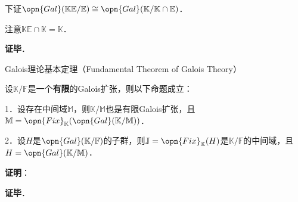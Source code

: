 下证$\opn{Gal}(\mathbb{KE}/\mathbb{E})\cong\opn{Gal}(\mathbb{K}/\mathbb{K}\cap\mathbb{E})$．

注意$\mathbb{KE}\cap \mathbb{K}=\mathbb{K}$．

\textbf{证毕}．











\begin{theorem}{Galois理论基本定理（Fundamental Theorem of Galois Theory）}

设$\mathbb{K}/\mathbb{F}$是一个\textbf{有限}的Galois扩张，则以下命题成立：

1．设存在中间域$\mathbb{M}$，则$\mathbb{K}/\mathbb{M}$也是有限Galois扩张，且$\mathbb{M}=\opn{Fix}_\mathbb{K}(\opn{Gal}(\mathbb{K}/\mathbb{M}))$．

2．设$H$是$\opn{Gal}(\mathbb{K}/\mathbb{F})$的子群，则$\mathbb{J}=\opn{Fix}_\mathbb{K}(H)$是$\mathbb{K}/\mathbb{F}$的中间域，且$H=\opn{Gal}(\mathbb{K}/\mathbb{M})$．


\end{theorem}

\textbf{证明}：



\textbf{证毕}．


















